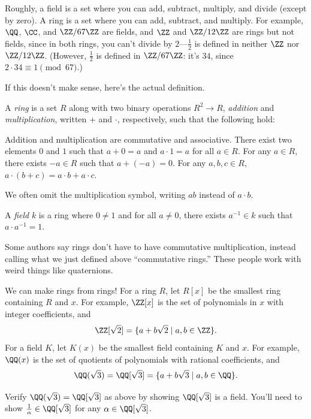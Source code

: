 \documentclass[11pt]{scrartcl}
\begin{document}
Roughly, a field is a set where you can add, subtract, multiply, and divide (except by zero).
A ring is a set where you can add, subtract, and multiply.
For example, $\QQ$, $\CC$, and $\ZZ/67\ZZ$ are fields,
and $\ZZ$ and $\ZZ/12\ZZ$ are rings but not fields, since in both rings,
you can't divide by $2$---$\frac12$ is defined in neither $\ZZ$ nor $\ZZ/12\ZZ$.
(However, $\frac12$ is defined in $\ZZ/67\ZZ$: it's $34$, since $2 \cdot 34 \equiv 1 \pmod{67}$.)

If this doesn't make sense, here's the actual definition.
\begin{definition}
	A \emph{ring} is a set $R$ along with two binary operations $R^2 \to R$,
	\emph{addition} and \emph{multiplication}, written $+$ and $\cdot$,
	respectively, such that the following hold:
	\begin{itemize}
		\ii Addition and multiplication are commutative and associative.
		\ii There exist two elements $0$ and $1$
		such that $a + 0 = a$ and $a \cdot 1 = a$ for all $a \in R$.
		\ii For any $a \in R$, there exists $-a \in R$ such that $a + (-a) = 0$.
		\ii For any $a,b,c \in R$, $a \cdot (b + c) = a \cdot b + a \cdot c$.
	\end{itemize}
	We often omit the multiplication symbol, writing $ab$ instead of $a \cdot b$.

	A \emph{field} $k$ is a ring where $0 \neq 1$ and for all $a \neq 0$,
	there exists $a^{-1} \in k$ such that $a \cdot a^{-1} = 1$.
\end{definition}

Some authors say rings don't have to have commutative multiplication,
instead calling what we just defined above ``commutative rings.''
These people work with weird things like quaternions.

We can make rings from rings! For a ring $R$, let $R[x]$ be the smallest ring
containing $R$ and $x$. For example, $\ZZ[x]$ is the set of polynomials in $x$
with integer coefficients, and 
\[\ZZ[\sqrt 2] = \{a + b\sqrt2 \mid a,b \in \ZZ\}.\]
For a field $K$, let $K(x)$ be the smallest field containing $K$ and $x$.
For example, $\QQ(x)$ is the set of quotients of polynomials with
rational coefficients, and
\[\QQ(\sqrt3) = \QQ[\sqrt 3] = \{a + b\sqrt 3 \mid a,b \in \QQ\}.\]

\begin{exercise}
	\label{exe:q-sqrt3}
	Verify $\QQ(\sqrt3) = \QQ[\sqrt 3]$ as above by showing $\QQ[\sqrt3]$ is a field.
	You'll need to show $\frac1\alpha \in \QQ[\sqrt3]$ for any $\alpha \in \QQ[\sqrt3]$.
\end{exercise}
\end{document}
